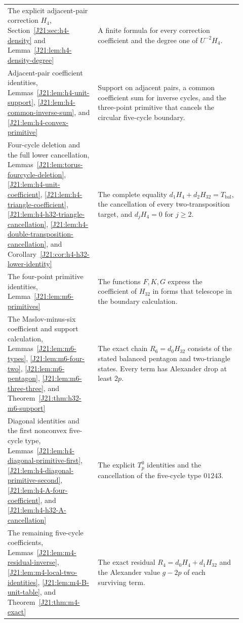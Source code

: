 \documentclass[11pt,oneside]{report}
\theoremstyle{definition}
\numberwithin{equation}{section}
\begin{document}
\begin{longtable}{@{}>{\raggedright\arraybackslash}p{0.35\linewidth}
>{\raggedright\arraybackslash}p{0.57\linewidth}@{}}
The explicit adjacent-pair correction $H_4$,
Section~\ref{J21:sec:h4-density} and
Lemma~\ref{J21:lem:h4-density-degree}
&A finite formula for every correction coefficient and the degree
one of $U^{-2}H_4$.\\[3pt]

Adjacent-pair coefficient identities,
Lemmas~\ref{J21:lem:h4-unit-support},
\ref{J21:lem:h4-common-inverse-sum}, and
\ref{J21:lem:h4-convex-primitive}
&Support on adjacent pairs, a common coefficient sum for inverse
cycles, and the three-point primitive that cancels the circular
five-cycle boundary.\\[3pt]

Four-cycle deletion and the full lower cancellation,
Lemmas~\ref{J21:lem:torus-fourcycle-deletion},
\ref{J21:lem:h4-unit-coefficient},
\ref{J21:lem:h4-triangle-coefficient},
\ref{J21:lem:h4-h32-triangle-cancellation},
\ref{J21:lem:h4-double-transposition-cancellation}, and
Corollary~\ref{J21:cor:h4-h32-lower-identity}
&The complete equality $d_1H_4+d_2H_{32}=T_{\mathrm{bal}}$,
the cancellation of every two-transposition target, and
$d_jH_4=0$ for $j\geq2$.\\[3pt]

The four-point primitive identities,
Lemma~\ref{J21:lem:m6-primitives}
&The functions $F,K,G$ express the coefficient of $H_{32}$ in
forms that telescope in the boundary calculation.\\[3pt]

The Maslov-minus-six coefficient and support calculation,
Lemmas~\ref{J21:lem:m6-types}, \ref{J21:lem:m6-four-two},
\ref{J21:lem:m6-pentagon}, \ref{J21:lem:m6-three-three}, and
Theorem~\ref{J21:thm:h32-m6-support}
&The exact chain $R_6=d_0H_{32}$ consists of the stated balanced
pentagon and two-triangle states. Every term has Alexander drop
at least $2p$.\\[3pt]

Diagonal identities and the first nonconvex five-cycle type,
Lemmas~\ref{J21:lem:h4-diagonal-primitive-first},
\ref{J21:lem:h4-diagonal-primitive-second},
\ref{J21:lem:h4-A-four-coefficient}, and
\ref{J21:lem:h4-h32-A-cancellation}
&The explicit $T_p^0$ identities and the cancellation of the
five-cycle type $01243$.\\[3pt]

The remaining five-cycle coefficients,
Lemmas~\ref{J21:lem:m4-residual-inverse},
\ref{J21:lem:m4-local-two-identities},
\ref{J21:lem:m4-B-unit-table}, and
Theorem~\ref{J21:thm:m4-exact}
&The exact residual $R_4=d_0H_4+d_1H_{32}$ and the Alexander
value $g-2p$ of each surviving term.\\[3pt]


\end{longtable}
\end{document}
